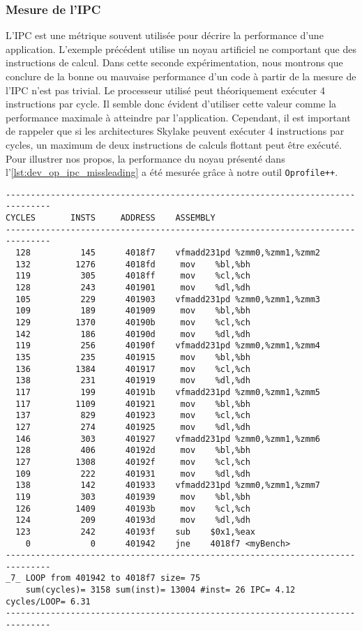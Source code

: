     \subsubsection{Mesure de l'IPC}
    
        L'IPC est une métrique souvent utilisée pour décrire la performance d'une application. L'exemple précédent utilise un noyau artificiel ne comportant que des instructions de calcul. Dans cette seconde expérimentation, nous montrons que conclure de la bonne ou mauvaise performance d'un code à partir de la mesure de l'IPC n'est pas trivial. Le processeur utilisé peut théoriquement exécuter 4 instructions par cycle. Il semble donc évident d'utiliser cette valeur comme la performance maximale à atteindre par l'application. Cependant, il est important de rappeler que si les architectures Skylake peuvent exécuter 4 instructions par cycles, un maximum de deux instructions de calculs flottant peut être exécuté. Pour illustrer nos propos, la performance du noyau présenté dans l'\autoref{lst:dev_op_ipc_missleading} a été mesurée grâce à notre outil \verb=Oprofile++=.

\begin{lstlisting}[label=lst:dev_op_ipc_missleading, caption=Noyau de calcul n'exécutant qu'une opération de calcul par cycle.]
-------------------------------------------------------------------------------
CYCLES       INSTS     ADDRESS    ASSEMBLY                         
-------------------------------------------------------------------------------
  128          145      4018f7    vfmadd231pd %zmm0,%zmm1,%zmm2
  132         1276      4018fd     mov    %bl,%bh
  119          305      4018ff     mov    %cl,%ch
  128          243      401901     mov    %dl,%dh
  105          229      401903    vfmadd231pd %zmm0,%zmm1,%zmm3
  109          189      401909     mov    %bl,%bh
  129         1370      40190b     mov    %cl,%ch
  142          186      40190d     mov    %dl,%dh
  119          256      40190f    vfmadd231pd %zmm0,%zmm1,%zmm4
  135          235      401915     mov    %bl,%bh
  136         1384      401917     mov    %cl,%ch
  138          231      401919     mov    %dl,%dh
  117          199      40191b    vfmadd231pd %zmm0,%zmm1,%zmm5
  117         1109      401921     mov    %bl,%bh
  137          829      401923     mov    %cl,%ch
  127          274      401925     mov    %dl,%dh
  146          303      401927    vfmadd231pd %zmm0,%zmm1,%zmm6
  128          406      40192d     mov    %bl,%bh
  127         1308      40192f     mov    %cl,%ch
  109          222      401931     mov    %dl,%dh
  138          142      401933    vfmadd231pd %zmm0,%zmm1,%zmm7
  119          303      401939     mov    %bl,%bh
  126         1409      40193b     mov    %cl,%ch
  124          209      40193d     mov    %dl,%dh
  123          242      40193f    sub    $0x1,%eax
    0            0      401942    jne    4018f7 <myBench>
-------------------------------------------------------------------------------
_7_ LOOP from 401942 to 4018f7 size= 75 
    sum(cycles)= 3158 sum(inst)= 13004 #inst= 26 IPC= 4.12 cycles/LOOP= 6.31
-------------------------------------------------------------------------------
\end{lstlisting} 
        
